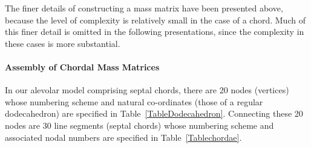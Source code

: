 The finer details of constructing a mass matrix have been presented above, because the level of complexity is relatively small in the case of a chord.  Much of this finer detail is omitted in the following presentations, since the complexity in these cases is more substantial.

\paragraph{Assembly of Chordal Mass Matrices}

In our alevolar model comprising septal chords, there are 20 nodes (vertices) whose numbering scheme and natural co-ordinates (those of a regular dodecahedron) are specified in Table~\ref{TableDodecahedron}.  Connecting these 20 nodes are 30 line segments (septal chords) whose numbering scheme and associated nodal numbers are specified in Table~\ref{Tablechordae}.


